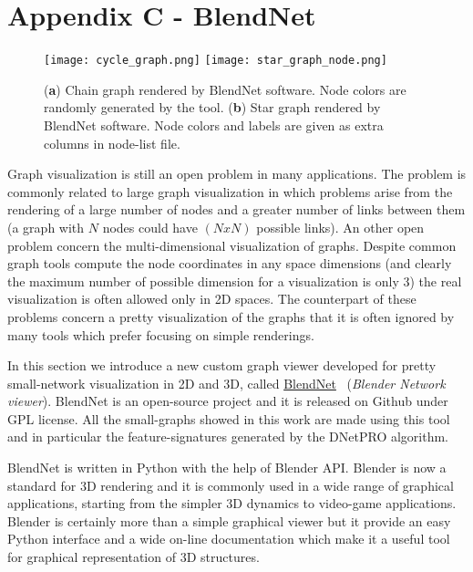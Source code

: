 \documentclass{standalone}
\begin{document}
\chapter*{Appendix C - BlendNet}

\begin{figure}[htbp]
\centering
\texttt{[image: cycle\_graph.png]}
\qquad\qquad
\texttt{[image: star\_graph\_node.png]}
\caption{(\textbf{a}) Chain graph rendered by \textsf{BlendNet} software.
Node colors are randomly generated by the tool.
(\textbf{b}) Star graph rendered by \textsf{BlendNet} software.
Node colors and labels are given as extra columns in node-list file.
}
\label{fig:blendnet}
\end{figure}

Graph visualization is still an open problem in many applications.
The problem is commonly related to large graph visualization in which problems arise from the rendering of a large number of nodes and a greater number of links between them (a graph with $N$ nodes could have $(N x N)$ possible links).
An other open problem concern the multi-dimensional visualization of graphs.
Despite common graph tools compute the node coordinates in any space dimensions (and clearly the maximum number of possible dimension for a visualization is only 3) the real visualization is often allowed only in 2D spaces.
The counterpart of these problems concern a pretty visualization of the graphs that it is often ignored by many tools which prefer focusing on simple renderings.

In this section we introduce a new custom graph viewer developed for pretty small-network visualization in 2D and 3D, called \href{https://github.com/Nico-Curti/BlendNet}{\textsf{BlendNet}}~\cite{BlendNet} (\emph{Blender Network viewer}).
\textsf{BlendNet} is an open-source project and it is released on Github under GPL license.
All the small-graphs showed in this work are made using this tool and in particular the feature-signatures generated by the \textsf{DNetPRO} algorithm.

\textsf{BlendNet} is written in \textsf{Python} with the help of \textsf{Blender} API.
\textsf{Blender} is now a standard for 3D rendering and it is commonly used in a wide range of graphical applications, starting from the simpler 3D dynamics to video-game applications.
\textsf{Blender} is certainly more than a simple graphical viewer but it provide an easy \textsf{Python} interface and a wide on-line documentation which make it a useful tool for graphical representation of 3D structures.
\end{document}
